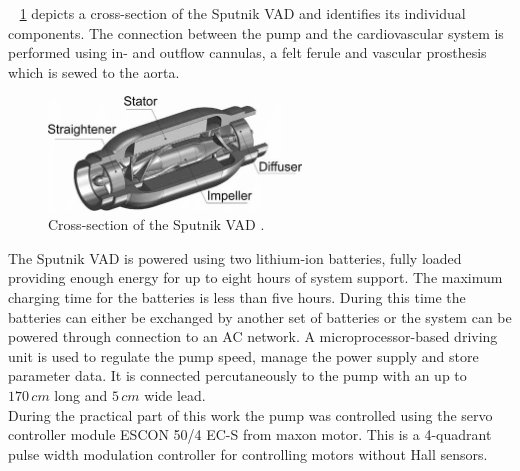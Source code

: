 \figurename~ \ref{fig:sput_cross} depicts a cross-section of the Sputnik VAD and identifies its individual components.
The connection between the pump and the cardiovascular system is performed using in- and outflow cannulas, a felt ferule and vascular prosthesis which is sewed to the aorta. \cite{Sputnik1}
\begin{figure}[ht]
  \centering
  \includegraphics[width=0.6\textwidth]{images/chapt_4/sputnik_cross.png}
  \caption[Cross-section of Sputnik VAD \cite{Sputnik6}]{Cross-section of the Sputnik VAD \cite{Sputnik6}.}
  \label{fig:sput_cross}
\end{figure}
The Sputnik VAD is powered using two lithium-ion batteries, fully loaded providing enough energy for up to eight hours of system support. The maximum charging time for the batteries is less than five hours. During this time the batteries can either be exchanged by another set of batteries or the system can be powered through connection to an AC network. A microprocessor-based driving unit is used to regulate the pump speed, manage the power supply and store parameter data. It is connected percutaneously to the pump with an up to $170\, cm$ long and $5\, cm$ wide lead. \cite{Sputnik1}
\\During the practical part of this work the pump was controlled using the servo controller module ESCON 50/4 EC-S from maxon motor. This is a 4-quadrant pulse width modulation controller for controlling motors without Hall sensors.

